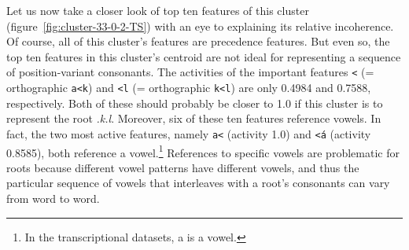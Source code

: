 Let us now take a closer look of top ten features of this cluster (figure~\ref{fig:cluster-33-0-2-TS}) with an eye to explaining its relative incoherence. 
Of course, all of this cluster's features are precedence features. But even so, the top ten features in this cluster's centroid are not ideal for representing 
a %
sequence of position-variant consonants.
The activities of the important features 
\texttt{<} (= orthographic \texttt{a<k}) and \texttt{<l} (= orthographic \texttt{k<l}) are only 0.4984 and
 0.7588, respectively. Both of these should probably be closer to 1.0 if this cluster is to represent the
 root \textit{{.k.l}}. Moreover, six of these ten features reference vowels. 
In fact, the two most active features, namely \texttt{a<} (activity 1.0) and \texttt{<\'{a}} (activity 0.8585), both reference a vowel.\footnote{In the transcriptional datasets, \textsf{a} is a vowel.} References to specific vowels are problematic for roots because different vowel patterns have different vowels, and thus the particular sequence of vowels that interleaves with a root's consonants can vary from word to word.

